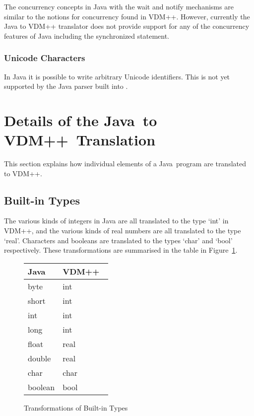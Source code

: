 \documentclass[\pformat,12pt]{article}
\newcommand{\vdmslpp}{VDM++}
\newcommand{\JAVA}{Java}
\newcommand{\VDM}{VDM++}
\begin{document}
The concurrency concepts in Java with the wait and notify mechanisms
are similar to the notions for concurrency found in VDM++. However,
currently the Java to VDM++ translator does not provide support
for any of the concurrency features of Java including the
synchronized statement.

\subsubsection{Unicode Characters}

In Java it is possible to write arbitrary Unicode identifiers. This is
not yet supported by the Java parser built into \VDMTools.

\newpage
\section{Details of the \JAVA\ to \vdmslpp\ Translation}\label{sec:translation}

This section explains how individual elements of a \JAVA\ program are
translated to \vdmslpp.

\subsection{Built-in Types}\label{types}

The various kinds of integers in Java are all translated to the type
`int' in VDM++, and the various kinds of real numbers are all
translated to the type `real'. Characters and booleans are translated
to the types `char' and `bool' respectively. These transformations are
summarised in the table in Figure~\ref{fig:typexfs}.

\begin{figure}[htbp]
  \begin{center}
\begin{longtable}{|l|l|}
\hline
  \JAVA\   & \VDM\ \\ \hline \hline
  byte   & int \\ \hline
  short  & int \\ \hline
  int    & int \\ \hline
  long   & int \\ \hline
  float  & real \\ \hline
  double & real \\ \hline
  char  & char \\ \hline
  boolean  & bool \\ \hline
\end{longtable}    
    \caption{Transformations of Built-in Types}
    \label{fig:typexfs}
  \end{center}
\end{figure}
\end{document}
